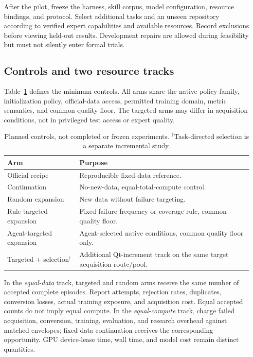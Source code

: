 \documentclass[10pt,twocolumn,letterpaper]{article}
\begin{document}
After the pilot, freeze the harness, skill corpus, model configuration, resource
bindings, and protocol. Select additional tasks and an unseen repository according
to verified expert capabilities and available resources. Record exclusions before
viewing held-out results. Development repairs are allowed during feasibility but
must not silently enter formal trials.

\subsection{Controls and two resource tracks}
Table~\ref{tab:controls} defines the minimum controls. All arms share the native
policy family, initialization policy, official-data access, permitted training
domain, metric semantics, and common quality floor. The targeted arms may differ
in acquisition conditions, not in privileged test access or expert quality.

\begin{table}[t]
\centering\small
\begin{tabular}{@{}p{.29\linewidth}p{.63\linewidth}@{}}
\toprule
Arm & Purpose \\
\midrule
Official recipe & Reproducible fixed-data reference.\\
Continuation & No-new-data, equal-total-compute control.\\
Random expansion & New data without failure targeting.\\
Rule-targeted expansion & Fixed failure-frequency or coverage rule, common quality floor.\\
Agent-targeted expansion & Agent-selected native conditions, common quality floor only.\\
Targeted + selection$^{\dagger}$ & Additional Qt-increment track on the same target acquisition route/pool.\\
\bottomrule
\end{tabular}
\caption{Planned controls, not completed or frozen experiments.
$^{\dagger}$Task-directed selection is a separate incremental study.}
\label{tab:controls}
\end{table}

In the \emph{equal-data} track, targeted and random arms receive the same number
of accepted complete episodes. Report attempts, rejection rates, duplicates,
conversion losses, actual training exposure, and acquisition cost. Equal accepted
counts do not imply equal compute. In the \emph{equal-compute} track, charge failed
acquisition, conversion, training, evaluation, and research overhead against
matched envelopes; fixed-data continuation receives the corresponding opportunity.
GPU device-lease time, wall time, and model cost remain distinct quantities.
\end{document}
